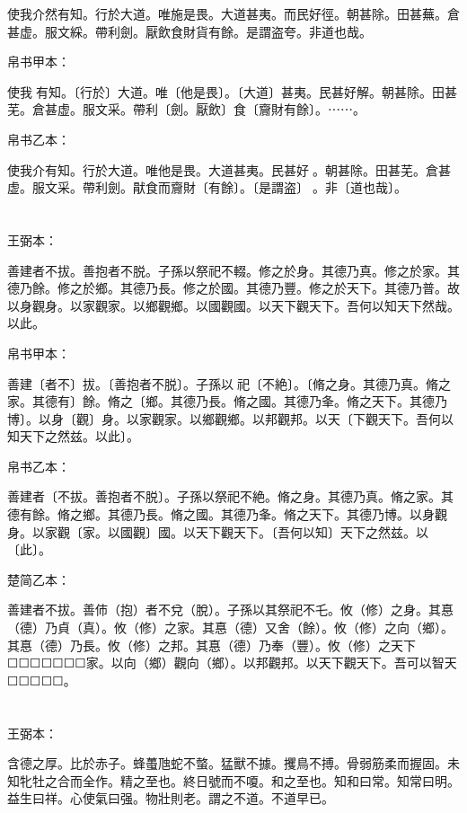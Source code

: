 \documentclass[a5paper]{ctexbook}
\begin{document}
    使我介然有知。行於大道。唯施是畏。大道甚夷。而民好徑。朝甚除。田甚蕪。倉甚虚。服文綵。帶利劍。厭飲食財貨有餘。是謂盗夸。非道也哉。

    
    帛书甲本：

    使我𢴲有知。〔行於〕大道。唯〔他是畏〕。〔大道〕甚夷。民甚好解。朝甚除。田甚芜。倉甚虚。服文采。帶利〔劍。厭飲〕食〔齎財有餘〕。⋯⋯。

    帛书乙本：

    使我介有知。行於大道。唯他是畏。大道甚夷。民甚好𠎿。朝甚除。田甚芜。倉甚虚。服文采。帶利劍。猒食而齎財〔有餘〕。〔是謂盗〕󱀖。非〔道也哉〕。

    \chapter{}
    王弼本：

    善建者不拔。善抱者不脱。子孫以祭祀不輟。修之於身。其德乃真。修之於家。其德乃餘。修之於鄉。其德乃長。修之於國。其德乃豐。修之於天下。其德乃普。故以身觀身。以家觀家。以鄉觀鄉。以國觀國。以天下觀天下。吾何以知天下然哉。以此。

    
    帛书甲本：

    善建〔者不〕拔。〔善抱者不脱〕。子孫以󱁃祀〔不絶〕。〔脩之身。其德乃真。脩之家。其德有〕餘。脩之〔鄉。其德乃長。脩之國。其德乃夆。脩之天下。其德乃博〕。以身〔觀〕身。以家觀家。以鄉觀鄉。以邦觀邦。以天〔下觀天下。吾何以知天下之然兹。以此〕。

    帛书乙本：

    善建者〔不拔。善抱者不脱〕。子孫以祭祀不絶。脩之身。其德乃真。脩之家。其德有餘。脩之鄉。其德乃長。脩之國。其德乃夆。脩之天下。其德乃博。以身觀身。以家觀〔家。以國觀〕國。以天下觀天下。〔吾何以知〕天下之然兹。以〔此〕。

    楚简乙本：

    善建者不拔。善伂（抱）者不兌（脫）。子孫以其祭祀不乇。攸（修）之身。其惪（德）乃貞（真）。攸（修）之家。其惪（德）又舍（餘）。攸（修）之向（鄉）。其惪（德）乃長。攸（修）之邦。其惪（德）乃奉（豐）。攸（修）之天下☐☐☐☐☐☐☐家。以向（鄉）觀向（鄉）。以邦觀邦。以天下觀天下。吾可以智天☐☐☐☐☐。

    \chapter{}
    王弼本：

    含德之厚。比於赤子。蜂蠆虺蛇不螫。猛獸不據。攫鳥不搏。骨弱筋柔而握固。未知牝牡之合而全作。精之至也。終日號而不嗄。和之至也。知和曰常。知常曰明。益生曰祥。心使氣曰强。物壯則老。謂之不道。不道早已。
\end{document}
